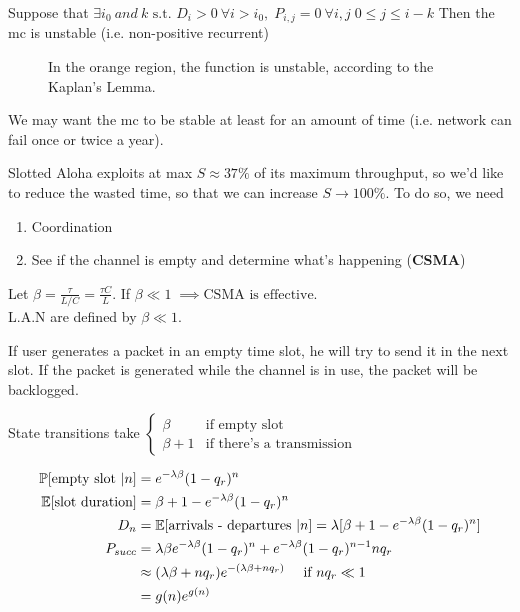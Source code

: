 \begin{lemma}
Suppose that $\exists i_0 ~and ~k \text{ s.t. } D_i>0 ~\forall i> i_0 , \; P_{i,j} = 0 ~\forall i,j \; 0 \le j \le i-k$
Then the \gls{mc} is unstable (i.e. non-positive recurrent)

\begin{figure}
	\centering
	
	\caption{In the orange region, the function is unstable, according to the Kaplan's Lemma.}
	\label{fig:kaplan}
\end{figure}

We may want the \gls{mc} to be stable at least for an amount of time (i.e. network can fail once or twice a year).
\end{lemma}

Slotted Aloha exploits at max $S \approx 37 \%$ of its maximum throughput, so we'd like to reduce the wasted time,
so that we can increase $S \to 100\%$. To do so, we need
\begin{enumerate}
	\item Coordination
	\item See if the channel is empty and determine what's happening (\textbf{CSMA})
\end{enumerate}

Let $\beta = \frac{\tau}{L/C} = \frac{\tau C}{L}$. If $\beta \ll 1 \; \implies \text{CSMA is effective}$. \\
L.A.N are defined by $\beta \ll 1$.

If user generates a packet in an empty time slot, he will try to send it in the next slot. If the packet is generated while the channel is in use, the packet will be backlogged.

State transitions take $\begin{cases}
	\beta & \text{if empty slot} \\
	\beta + 1 & \text{if there's a transmission}
\end{cases}$

\begin{equation}\begin{split}
	\mathbb{P}[\text{empty slot }|n] &= e^{-\lambda \beta} (1-q_r)^n \\
	\mathbb{E}[\text{slot duration}] &= \beta + 1 - e^{-\lambda\beta} (1-q_r)^n \\
	D_n &= \mathbb{E}[\text{arrivals - departures }|n ]= \lambda [\beta + 1 - e^{-\lambda \beta} (1-q_r)^n ]\\
	P_{succ} &= \lambda \beta e^{-\lambda \beta} (1-q_r)^n + e^{-\lambda \beta} (1-q_r)^{n-1} n q_r \\
	&\approx (\lambda \beta + n q_r) e^{-(\lambda \beta + n q_r)} \quad \text{ if } n q_r \ll 1 \\
	&= g(n) e^{g(n)}
\end{split}\end{equation}

